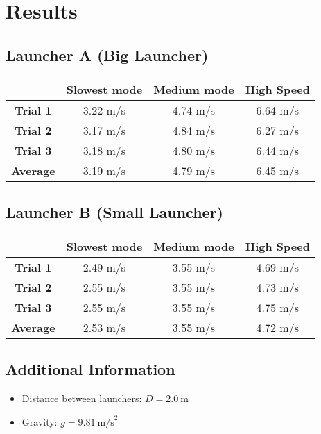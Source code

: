 \documentclass[12pt]{article}
\begin{document}
\section{Results}

\subsection{Launcher A (Big Launcher)}
\begin{center}
\begin{tabular}{|c|c|c|c|}
\hline
    & \textbf{Slowest mode} & \textbf{Medium mode} & \textbf{High Speed} \\
\hline
\textbf{Trial 1} & 3.22 m/s & 4.74 m/s & 6.64 m/s \\
\textbf{Trial 2} & 3.17 m/s & 4.84 m/s & 6.27 m/s \\
\textbf{Trial 3} & 3.18 m/s & 4.80 m/s & 6.44 m/s \\
\hline
\textbf{Average} & 3.19 m/s & 4.79 m/s & 6.45 m/s \\
\hline
\end{tabular}
\end{center}

\subsection{Launcher B (Small Launcher)}
\begin{center}
\begin{tabular}{|c|c|c|c|}
\hline
    & \textbf{Slowest mode} & \textbf{Medium mode} & \textbf{High Speed} \\
\hline
\textbf{Trial 1} & 2.49 m/s & 3.55 m/s & 4.69 m/s \\
\textbf{Trial 2} & 2.55 m/s & 3.55 m/s & 4.73 m/s \\
\textbf{Trial 3} & 2.55 m/s & 3.55 m/s & 4.75 m/s \\
\hline
\textbf{Average} & 2.53 m/s & 3.55 m/s & 4.72 m/s \\
\hline
\end{tabular}
\end{center}

\subsection{Additional Information}
\begin{itemize}
    \item Distance between launchers: $D = 2.0 \ \text{m}$
    \item Gravity: $g = 9.81 \ \text{m/s}^2$
\end{itemize}
\end{document}
